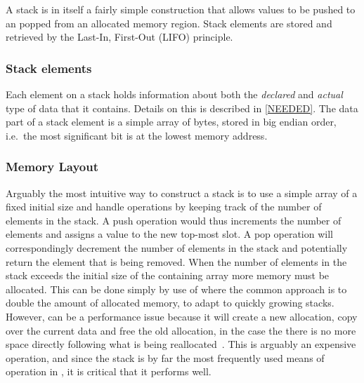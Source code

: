 A stack is in itself a fairly simple construction that allows values to be
pushed to an popped from an allocated memory region. Stack elements are stored
and retrieved by the Last-In, First-Out (LIFO) principle.

\subsubsection{Stack elements}

Each element on a stack holds information about both the \textit{declared} and
\textit{actual} type of data that it contains. Details on this is described in
\ref{NEEDED}. The data part of a stack element is a simple array of bytes,
stored in big endian order, i.e.~the most significant bit is at the lowest
memory address.

\subsubsection{Memory Layout}

Arguably the most intuitive way to construct a stack is to use a simple array of
a fixed initial size and handle operations by keeping track of the number of
elements in the stack. A push operation would thus increments the number of
elements and assigns a value to the new top-most slot. A pop operation will
correspondingly decrement the number of elements in the stack and potentially
return the element that is being removed. When the number of elements in the
stack exceeds the initial size of the containing array more memory must be
allocated. This can be done simply by use of  where the common
approach is to double the amount of allocated memory, to adapt to quickly
growing stacks. However,  can be a performance issue because it
will create a new allocation, copy over the current data and free the old
allocation, in the case the there is no more space directly following what is
being reallocated~\cite{man-realloc}. This is arguably an expensive operation,
and since the stack is by far the most frequently used means of operation in
\thename{}, it is critical that it performs well.

